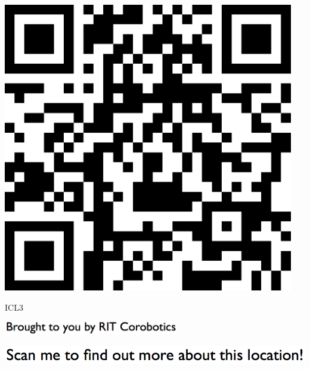 \documentclass[letterpaper]{article}
\begin{document}
 \begingroup 
 \centerline{\includegraphics[scale=1,width=5in,height=5in]{ICL3.png}} 
 \endgroup 
 \vspace*{\fill} 

 \hfill{\small ICL3} 

  \vspace{0.7in} 
 
 \centerline{\includegraphics[scale=1,width=3in]{text-bottom.png}} 
 
 \pagebreak 
{} 
 \vspace*{\fill} 
 
  \centerline{\includegraphics[scale=1,width=6in]{text-top.png}} 
 
 \vspace{0.5in} 
 
\end{document}
